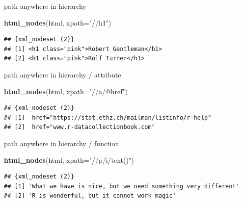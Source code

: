 \documentclass[ignorenonframetext,]{beamer}
\newenvironment{Shaded}{\begin{snugshade}}{\end{snugshade}}
\newcommand{\KeywordTok}[1]{\textcolor[rgb]{0.13,0.29,0.53}{\textbf{{#1}}}}
\newcommand{\DataTypeTok}[1]{\textcolor[rgb]{0.13,0.29,0.53}{{#1}}}
\newcommand{\StringTok}[1]{\textcolor[rgb]{0.31,0.60,0.02}{{#1}}}
\newcommand{\NormalTok}[1]{{#1}}
\begin{document}
\begin{frame}[fragile]{path anywhere in hierarchy}

\begin{Shaded}
\begin{Highlighting}[]
\KeywordTok{html_nodes}\NormalTok{(html, }\DataTypeTok{xpath=}\StringTok{"//h1"}\NormalTok{)}
\end{Highlighting}
\end{Shaded}

\begin{verbatim}
## {xml_nodeset (2)}
## [1] <h1 class="pink">Robert Gentleman</h1>
## [2] <h1 class="pink">Rolf Turner</h1>
\end{verbatim}

\end{frame}

\begin{frame}[fragile]{path anywhere in hierarchy / attribute}

\begin{Shaded}
\begin{Highlighting}[]
\KeywordTok{html_nodes}\NormalTok{(html, }\DataTypeTok{xpath=}\StringTok{"//a/@href"}\NormalTok{)}
\end{Highlighting}
\end{Shaded}

\begin{verbatim}
## {xml_nodeset (2)}
## [1]  href="https://stat.ethz.ch/mailman/listinfo/r-help"
## [2]  href="www.r-datacollectionbook.com"
\end{verbatim}

\end{frame}

\begin{frame}[fragile]{path anywhere in hierarchy / function}

\begin{Shaded}
\begin{Highlighting}[]
\KeywordTok{html_nodes}\NormalTok{(html, }\DataTypeTok{xpath=}\StringTok{"//p/i/text()"}\NormalTok{)}
\end{Highlighting}
\end{Shaded}

\begin{verbatim}
## {xml_nodeset (2)}
## [1] 'What we have is nice, but we need something very different'
## [2] 'R is wonderful, but it cannot work magic'
\end{verbatim}

\end{frame}
\end{document}
